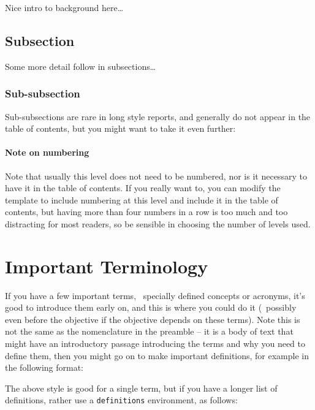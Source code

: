 Nice intro to background here\ldots{}

\subsection{Subsection}

Some more detail follow in subsections\ldots{}

\subsubsection{Sub-subsection}

Sub-subsections are rare in long style reports, and generally do not appear in the table of contents, but you might want to take it even further:

\paragraph{Note on numbering}

Note that usually this level does not need to be numbered, nor is it necessary to have it in the table of contents.  If you really want to, you can modify the template to include numbering at this level and include it in the table of contents, but having more than four numbers in a row is too much and too distracting for most readers, so be sensible in choosing the number of levels used.

\section{Important Terminology}

If you have a few important terms, \eg~specially defined concepts or acronyms, it's good to introduce them early on, and this is where you could do it (\ie~possibly even before the objective if the objective depends on these terms). Note this is not the same as the nomenclature in the preamble -- it is a body of text that might have an introductory passage introducing the terms and why you need to define them, then you might go on to make important definitions, for example in the following format:


The above style is good for a single term, but if you have a longer list of definitions, rather use a \verb|definitions| environment, as follows:


